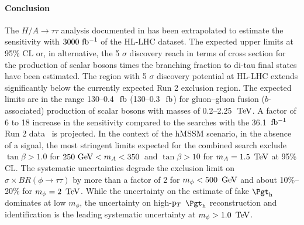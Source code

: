 \FloatBarrier

\paragraph{Conclusion}
\label{sec:conclusion}
The $H/A \to \tau\tau$ analysis documented in \cite{ATLASRun2Ditau} has been extrapolated to estimate the sensitivity with $3000~\mbox{fb$^{-1}$}$ of the HL-LHC dataset. The expected upper limits at 95\% CL or, in alternative, the 5 $\sigma$ discovery reach in terms of cross section for the production of scalar bosons times the branching fraction to di-tau final states have been estimated. The region with 5 $\sigma$ discovery potential at HL-LHC extends significantly below the currently expected Run 2 exclusion region. The expected limits are in the range 130--0.4~${\,{\rm fb}}$ (130--0.3~${\,{\rm fb}}$) for gluon--gluon fusion ($b$-associated) production of scalar bosons with masses of 0.2--2.25~$\,\text{Te\hspace{-.08em}V}$. A factor of 6 to 18 increase in the sensitivity compared to the searches with the 36.1~$\mbox{fb$^{-1}$}$ Run 2 data~\cite{ATLASRun2Ditau} is projected. In the context of the hMSSM scenario, in the absence of a signal, the most stringent limits expected for the combined search exclude $\tan\beta > 1.0$ for $250~{\rm{\ensuremath{\text{GeV}}}} < m_A < 350$~\GeV and $\tan\beta > 10$ for $m_A = 1.5~\,\text{Te\hspace{-.08em}V}$ at 95\% CL\@. The systematic uncertainties degrade the exclusion limit on $\sigma\times BR(\phi\to\tau\tau)$ by more than a factor of 2 for $m_\phi<500~\,\text{Ge\hspace{-.08em}V}$ and about 10\%--20\% for $m_\phi= 2~\,\text{Te\hspace{-.08em}V}$. While the uncertainty on the estimate of fake $\tauhad$ dominates at low $m_{\phi}$, the uncertainty on high-$\mathrm{p}_{T}$ $\tauhad$ reconstruction and identification is the leading systematic uncertainty at $m_\phi > 1.0~\,\text{Te\hspace{-.08em}V}$.
